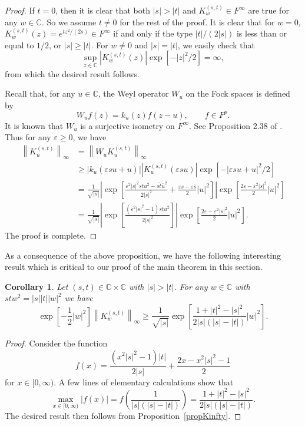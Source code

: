 \documentclass[reqno]{amsart}
\newtheorem{corollary}[theorem]{Corollary}
\newcommand{\C}{{\mathbb C}}
\begin{document}
\begin{proof}
If $t=0$, then it is clear that both $|s|>|t|$ and $K_w^{(s,t)}\in F^\infty$
are true for any $w\in\C$. So we assume $t\neq0$ for the rest of the proof.
It is clear that for $w=0$, $K_w^{(s,t)}(z)=e^{tz^2/(2s)}\in F^\infty$ if and
only if the type $|t|/(2|s|)$ is less than or equal to $1/2$, or $|s|\geq|t|$.
For $w\neq0$ and $|s|=|t|$, we easily check that
$$\sup\limits_{z\in\C}|K_w^{(s,t)}(z)|\exp [-|z|^2/2]=\infty,$$
from which the desired result follows.

Recall that, for any $u\in\C$, the Weyl operator $W_u$ on the Fock spaces
is defined by
$$W_uf(z)=k_u(z)f(z-u),\qquad f\in F^p.$$
It is known that $W_u$ is a surjective isometry on $F^{\infty}$. See
Proposition 2.38 of \cite{Zhu1}. Thus for any $\varepsilon\geq0$, we have
\begin{align*}
\left\|K^{(s,t)}_u\right\|_\infty&=\left\|W_uK^{(s,t)}_u\right\|_\infty\\[8pt]
&\geq\left|k_u(\varepsilon su+u)\right|\left|K_u^{(s,t)}(\varepsilon su)\right|
\exp\left[-|\varepsilon su+u|^2/2\right]\\[8pt]
&=\frac{1}{\sqrt{|s|}}\left|\exp \left[\frac{\varepsilon^2|s|^2stu^2-
\overline{st}\overline{u}^2}{2|s|^2}+\frac{\varepsilon s-
\varepsilon\overline{s}}{2}|u|^2\right]\right|\exp\left[
\frac{2\varepsilon-\varepsilon^2|s|^2}{2}|u|^2\right]\\[8pt]
&=\frac{1}{\sqrt{|s|}}\left|\exp\left[\frac{(\varepsilon^2|s|^2-1)stu^2}
{2|s|^2}\right]\right|\exp \left[\frac{2\varepsilon-\varepsilon^2|s|^2}{2}
|u|^2\right].
\end{align*}
The proof is complete.
\end{proof}

As a consequence of the above proposition, we have the following interesting
result which is critical to our proof of the main theorem in this section.

\begin{corollary}\label{corKinftymax}
Let $(s, t)\in\C\times\C$ with $|s|>|t|$. For any $w\in\C$ with
$stw^2=|s||t||w|^2$ we have
$$\exp\left[-\frac{1}{2}|w|^2\right]\left\|K^{(s,t)}_w\right\|_\infty\geq
\frac{1}{\sqrt{|s|}}\exp \left[\frac{1+|t|^2-|s|^2}{2|s|(|s|-|t|)}|w|^2\right].$$
\end{corollary}

\begin{proof}
Consider the function
$$f(x)=\frac{(x^2|s|^2-1)|t|}{2|s|}+\frac{2x-x^2|s|^2-1}{2}$$
for $x\in[0,\infty)$. A few lines of elementary calculations show that
$$\max_{x\in[0,\infty)}|f(x)|=f\left(\frac{1}{|s|(|s|-|t|)}\right)
=\frac{1+|t|^2-|s|^2}{2|s|(|s|-|t|)}.$$
The desired result then follows from Proposition~\ref{propKinfty}.
\end{proof}
\end{document}

